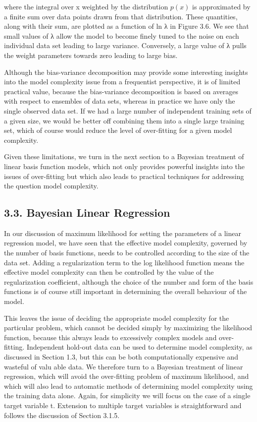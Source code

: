 \documentclass[
  10
]{article}
\begin{document}
where the integral over x weighted by the distribution \(p ( x )\) is
approximated by a finite sum over data points drawn from that
distribution. These quantities, along with their sum, are plotted as a
function of ln λ in Figure 3.6. We see that small values of λ allow the
model to become finely tuned to the noise on each individual data set
leading to large variance. Conversely, a large value of λ pulls the
weight parameters towards zero leading to large bias.

Although the bias-variance decomposition may provide some interesting
insights into the model complexity issue from a frequentist perspective,
it is of limited practical value, because the bias-variance
decomposition is based on averages with respect to ensembles of data
sets, whereas in practice we have only the single observed data set. If
we had a large number of independent training sets of a given size, we
would be better off combining them into a single large training set,
which of course would reduce the level of over-fitting for a given model
complexity.

Given these limitations, we turn in the next section to a Bayesian
treatment of linear basis function models, which not only provides
powerful insights into the issues of over-fitting but which also leads
to practical techniques for addressing the question model complexity.

\subsection{3.3. Bayesian Linear
Regression}\label{bayesian-linear-regression}

In our discussion of maximum likelihood for setting the parameters of a
linear regression model, we have seen that the effective model
complexity, governed by the number of basis functions, needs to be
controlled according to the size of the data set. Adding a
regularization term to the log likelihood function means the effective
model complexity can then be controlled by the value of the
regularization coefficient, although the choice of the number and form
of the basis functions is of course still important in determining the
overall behaviour of the model.

This leaves the issue of deciding the appropriate model complexity for
the particular problem, which cannot be decided simply by maximizing the
likelihood function, because this always leads to excessively complex
models and over-fitting. Independent hold-out data can be used to
determine model complexity, as discussed in Section 1.3, but this can be
both computationally expensive and wasteful of valu able data. We
therefore turn to a Bayesian treatment of linear regression, which will
avoid the over-fitting problem of maximum likelihood, and which will
also lead to automatic methods of determining model complexity using the
training data alone. Again, for simplicity we will focus on the case of
a single target variable t. Extension to multiple target variables is
straightforward and follows the discussion of Section 3.1.5.
\end{document}
